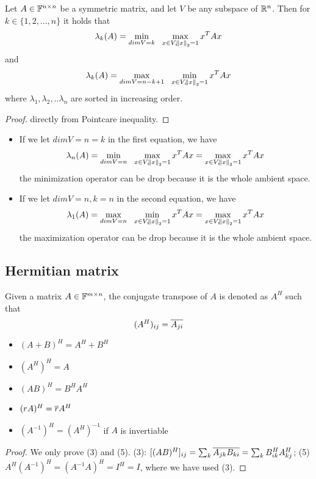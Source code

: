 \begin{refsection}
\begin{corollary}
	\cite{wiki:minmax}\cite[127]{calafiore2014optimization}\cite[237]{horn2012matrix} Let $A\in \mathbb{F}^{n\times n}$ be a symmetric matrix, and let $V$ be any subspace of $\mathbb{R}^n$. Then for $k\in \{1,2,...,n\}$ it holds that
	$$\lambda_k(A) = \min_{dim V = k} ~~ \max_{x\in V,\norm{x}_2 = 1} x^TAx $$
	and
	$$\lambda_k(A) = \max_{dim V = n-k+1} ~~ \min_{x\in V,\norm{x}_2 = 1} x^TAx$$
	where $\lambda_1,\lambda_2,..\lambda_n$ are sorted in increasing order.
\end{corollary}
\begin{proof}
	directly from Pointcare inequality.
\end{proof}


\begin{remark}\hfill
	\begin{itemize}
		\item If we let $dim V = n = k$ in the first equation, we have
		$$\lambda_n(A) = \min_{dim V = n} ~~ \max_{x\in V,\norm{x}_2 = 1} x^TAx = \max_{x\in V,\norm{x}_2 = 1} x^TAx $$
		the minimization operator can be drop because it is the whole ambient space.
		\item If we let $dim V = n, k = n$ in the second equation, we have
		$$\lambda_1(A) = \max_{dim V = n} ~~ \min_{x\in V,\norm{x}_2 = 1} x^TAx = \max_{x\in V,\norm{x}_2 = 1} x^TAx $$
		the maximization operator can be drop because it is the whole ambient space.
	\end{itemize}
\end{remark}


\subsection{Hermitian matrix}
\begin{definition}
Given a matrix $A\in \mathbb{F}^{m\times n}$, the conjugate transpose of $A$ is denoted as $A^H$ such that
$$(A^H)_{ij} = \overline{A_{ji}}$$
\end{definition}


\begin{lemma}\hfill
\begin{itemize}
    \item $(A+B)^H = A^H + B^H$
    \item $(A^H)^H = A$
    \item $(AB)^H=B^HA^H$
    \item $(rA)^H = \overline{r}A^H$
    \item $(A^{-1})^H = (A^H)^{-1}$ if $A$ is invertiable
\end{itemize}
\end{lemma}
\begin{proof}
We only prove (3) and (5). (3): $[(AB)^H]_{ij} = \sum_k \overline{A_{jk}B_{ki}} = \sum_{k} B^H_{ik}A^H_{kj}$; (5) $A^H (A^{-1})^H = (A^{-1}A)^H = I^H = I$, where we have used (3).
\end{proof}



\end{refsection}
